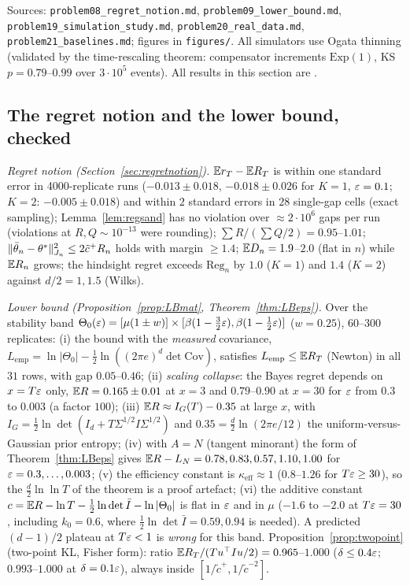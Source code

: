Sources: \texttt{problem08\_regret\_notion.md}, \texttt{problem09\_lower\_bound.md}, \texttt{problem19\_simulation\_study.md}, \texttt{problem20\_real\_data.md}, \texttt{problem21\_baselines.md}; figures in \texttt{figures/}. All simulators use Ogata thinning (validated by the time-rescaling theorem: compensator increments $\mathrm{Exp}(1)$, KS $p=0.79$--$0.99$ over $3\cdot10^5$ events). All results in this section are \Nt{}.

\subsection{The regret notion and the lower bound, checked}\label{sec:val-reg}
\emph{Regret notion (Section~\ref{sec:regretnotion}).} $\mathbb{E} r_T-\mathbb{E} R_T$ is within one standard error in 4000-replicate runs ($-0.013\pm0.018$, $-0.018\pm0.026$ for $K=1$, $\varepsilon=0.1$; $K=2$: $-0.005\pm0.018$) and within $2$ standard errors in $28$ single-gap cells (exact sampling); Lemma~\ref{lem:regsand} has no violation over $\approx2\cdot10^6$ gaps per run (violations at $R,Q\sim10^{-13}$ were rounding); $\sum R/(\sum Q/2)=0.95$--$1.01$; $\lVert \bar\theta_n-\theta^*\rVert^2_{J_n}\le2\tilde c^+R_n$ holds with margin $\ge1.4$; $\mathbb{E} D_n=1.9$--$2.0$ (flat in $n$) while $\mathbb{E} R_n$ grows; the hindsight regret exceeds $\mathrm{Reg}_n$ by $1.0$ ($K=1$) and $1.4$ ($K=2$) against $d/2=1,1.5$ (Wilks).

\emph{Lower bound (Proposition~\ref{prop:LBmat}, Theorem~\ref{thm:LBeps}).} Over the stability band $\Theta_0(\varepsilon)=[\mu(1\pm w)]\times[\beta(1-\tfrac32\varepsilon),\beta(1-\tfrac12\varepsilon)]$ ($w=0.25$), $60$--$300$ replicates:
(i) the bound with the \emph{measured} covariance, $L_{\mathrm{emp}}=\ln|\Theta_0|-\tfrac12\ln((2\pi e)^d\det\mathrm{Cov})$, satisfies $L_{\mathrm{emp}}\le\mathbb{E} R_T$ (Newton) in all $31$ rows, with gap $0.05$--$0.46$; (ii) \emph{scaling collapse}: the Bayes regret depends on $x=T\varepsilon$ only, $\mathbb{E} R=0.165\pm0.01$ at $x=3$ and $0.79$--$0.90$ at $x=30$ for $\varepsilon$ from $0.3$ to $0.003$ (a factor $100$); (iii) $\mathbb{E} R\approx I_G(T)-0.35$ at large $x$, with $I_G=\tfrac12\ln\det(I_d+T\Sigma^{1/2}I\Sigma^{1/2})$ and $0.35=\tfrac d2\ln(2\pi e/12)$ the uniform-versus-Gaussian prior entropy; (iv) with $A=N$ (tangent minorant) the form of Theorem~\ref{thm:LBeps} gives $\mathbb{E} R-L_N=0.78,0.83,0.57,1.10,1.00$ for $\varepsilon=0.3,\dots,0.003$; (v) the efficiency constant is $\kappa_{\mathrm{eff}}\approx1$ ($0.8$--$1.26$ for $T\varepsilon\ge30$), so the $\tfrac d2\ln\ln T$ of the theorem is a proof artefact; (vi) the additive constant $c=\mathbb{E} R-\ln T-\tfrac12\ln\det\bar I-\ln|\Theta_0|$ is flat in $\varepsilon$ and in $\mu$ ($-1.6$ to $-2.0$ at $T\varepsilon=30$, including $k_0=0.6$, where $\tfrac12\ln\det\bar I=0.59,0.94$ is needed). A predicted $(d-1)/2$ plateau at $T\varepsilon<1$ is \emph{wrong} for this band. Proposition~\ref{prop:twopoint} (two-point KL, Fisher form): ratio $\mathbb{E} R_T/(Tu^{\top} Iu/2)=0.965$--$1.000$ ($\delta\le0.4\varepsilon$; $0.993$--$1.000$ at $\delta=0.1\varepsilon$), always inside $[1/\tilde c^+,1/\tilde c^{-2}]$.

